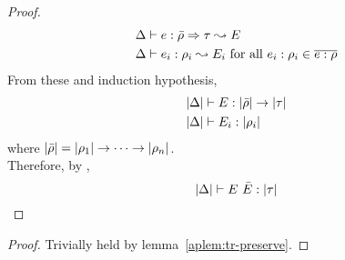 \begin{proof}
\begin{align*}
    & \Delta \vdash e:\bar{\rho} \Rightarrow \tau \leadsto E \\
    & \Delta \vdash e_i:\rho_i \leadsto E_i~\text{for
      all}~ e_i:\rho_i \in \overline{e:\rho}
  \end{align*}
  From these and induction hypothesis,
  \begin{align*}
    & |\Delta| \vdash E:|\bar{\rho}| \to |\tau| \\
    & |\Delta| \vdash E_i:|\rho_i|
  \end{align*}
  where $|\bar{\rho}| = |\rho_1| \to \cdots \to
  |\rho_n|$. \\
  Therefore, by \TyApp,
  \begin{equation*}
    |\Delta| \vdash E~\bar{E}:|\tau|
  \end{equation*}
\end{proof}

\thmtranstypreserve
\begin{proof}
  Trivially held by lemma~\ref{aplem:tr-preserve}.
\end{proof}







